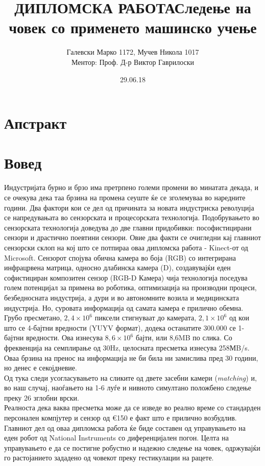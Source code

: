 \documentclass[12pt]{article}
\title{ДИПЛОМСКА РАБОТА\bigbreak \textbf{Следење на човек со применето машинско учење}}
\date{29.06.18}
\author{Галевски Марко 1172, Мучев Никола 1017	\\	Ментор: Проф. Д-р Виктор Гаврилоски}
\begin{document}
    \sloppy
    \maketitle{}
    \newpage
    \tableofcontents
    \newpage

\section*{Апстракт}

\section{Вовед}
  Индустријата бурно и брзо има претрпено големи промени во минатата декада, и се очекува дека таа брзина на промена сеуште ќе се зголемуваа во наредните години. Два фактори кои се дел од причината за новата индустриска револуција се напредувањата во сензорската и процесорската технологија.\bigbreak
  Подобрувањето во сензорската технологија доведува до две главни придобивки: пософистицирани сензори и драстично поевтини сензори. Овие два факти се очигледни кај главниот сензорски склоп на кој што се потпираа оваа дипломска работа - Kinect-от од Microsoft. Сензорот спојува обична камера во боја (RGB) со интегрирана инфрацрвена матрица, односно длабинска камера (D), создавувајќи еден софистициран композитен сензор (RGB-D Камера) чија технологија поседува голем потенцијал за примена во роботика, оптимизација на производни процеси, безбедносната индустрија, а дури и во автономните возила и медицинската индустрија.
  \bigbreak
  Но, суровата информација од самата камера е прилично обемна. Грубо пресметано, $2,4 \times 10^6$ пиксели стигнуваат до камерата, $2,1 \times 10^6$ од кои што се 4-бајтни вредности (YUYV формат), додека останатите 300.000 се 1-бајтни вредности. Ова изнесува $8,6 \times 10^6$ бајти, или 8,6MB по слика. Со фреквенција на семплирање од 30Hz, целосната пресметка изнесува 258МB/s. Оваа брзина на пренос на информација не би била ни замислива пред 30 години, но денес е секојдневие.
  \\
  Од тука следи усогласувањето на сликите од двете засебни камери (\textit{matching}) и, во наш случај, наоѓањето на 1-6 луѓе и нивното симултано положбено следење преку 26 зглобни врски.
  \\
  Реалноста дека ваква пресметка може да се изведе во реално време со стандарден персонален компјутер и сензор од €150 е факт што е прилично возбудлив.
  \bigbreak
  Главниот дел од оваа дипломска работа ќе биде составен од управувањето на еден робот од National Instruments со диференцијален погон. Целта на управувањето е да се постигне робустно и надежно следење на човек, одржувајќи го растојанието зададено од човекот преку гестикулации на рацете.
  \\
\end{document}
